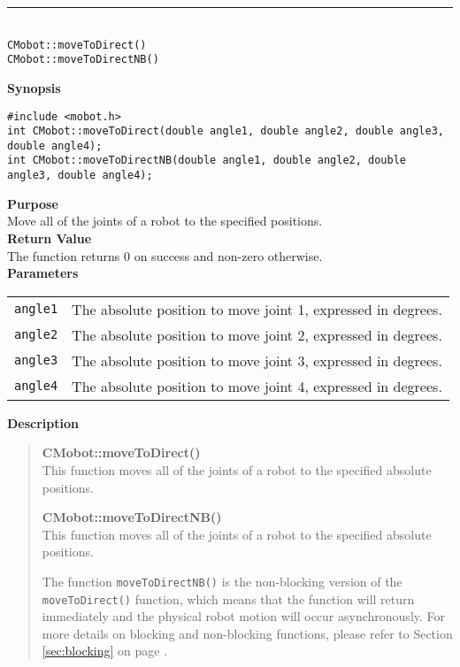\noindent
\vspace{5pt}
\rule{4.5in}{0.015in}\\
\noindent
{\LARGE \texttt{CMobot::moveToDirect()}}\\
{\LARGE \texttt{CMobot::moveToDirectNB()}}\\
{}

\noindent
{\bf Synopsis}
\vspace{-8pt}
\begin{verbatim}
#include <mobot.h>
int CMobot::moveToDirect(double angle1, double angle2, double angle3, double angle4);
int CMobot::moveToDirectNB(double angle1, double angle2, double angle3, double angle4);
\end{verbatim}

\noindent
{\bf Purpose}\\
Move all of the joints of a robot to the specified positions.\\

\noindent
{\bf Return Value}\\
The function returns 0 on success and non-zero otherwise.\\

\noindent
{\bf Parameters}\\
\vspace{-0.1in}
\begin{description}
\item               
\begin{tabular}{p{15 mm}p{105 mm}}
\texttt{angle1} & The absolute position to move joint 1, expressed in degrees. \\
\texttt{angle2} & The absolute position to move joint 2, expressed in degrees. \\
\texttt{angle3} & The absolute position to move joint 3, expressed in degrees. \\
\texttt{angle4} & The absolute position to move joint 4, expressed in degrees. \\
\end{tabular}
\end{description}
\noindent

{\bf Description}\\
\vspace{-12pt}
\begin{quote}
{\bf CMobot::moveToDirect()}\\
This function moves all of the joints of a robot to the specified absolute positions. 

{\bf CMobot::moveToDirectNB()}\\
This function moves all of the joints of a robot to the specified absolute positions. 

The function \texttt{moveToDirectNB()} is the non-blocking version of
the \texttt{moveToDirect()} function, which means that the function will return
immediately and the physical robot motion will occur asynchronously. For
more details on blocking and non-blocking functions, please refer to 
Section \ref{sec:blocking} on page \pageref{sec:blocking}.\\
\end{quote}


